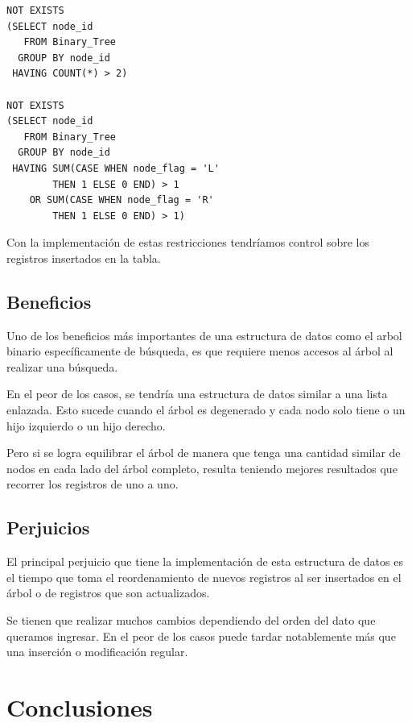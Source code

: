 \documentclass[twoside,twocolumn]{article}
\begin{document}
\begin{verbatim}
NOT EXISTS
(SELECT node_id
   FROM Binary_Tree
  GROUP BY node_id
 HAVING COUNT(*) > 2)
 
NOT EXISTS
(SELECT node_id
   FROM Binary_Tree
  GROUP BY node_id
 HAVING SUM(CASE WHEN node_flag = 'L'
        THEN 1 ELSE 0 END) > 1
    OR SUM(CASE WHEN node_flag = 'R'
        THEN 1 ELSE 0 END) > 1)
\end{verbatim}

Con la implementación de estas restricciones tendríamos control sobre los registros insertados en la tabla.
       
\subsection{Beneficios}
Uno de los beneficios más importantes de una estructura de datos como el arbol binario específicamente de búsqueda, es que requiere menos accesos al árbol al realizar una búsqueda.

En el peor de los casos, se tendría una estructura de datos similar a una lista enlazada. Esto sucede cuando el árbol es degenerado y cada nodo solo tiene o un hijo izquierdo o un hijo derecho.

Pero si se logra equilibrar el árbol de manera que tenga una cantidad similar de nodos en cada lado del árbol completo, resulta teniendo mejores resultados que recorrer los registros de uno a uno.


\subsection{Perjuicios}
El principal perjuicio que tiene la implementación de esta estructura de datos es el tiempo que toma el reordenamiento de nuevos registros al ser insertados en el árbol o de registros que son actualizados.

Se tienen que realizar muchos cambios dependiendo del orden del dato que queramos ingresar. En el peor de los casos puede tardar notablemente más que una inserción o modificación regular.
       
\section{Conclusiones}
\end{document}
